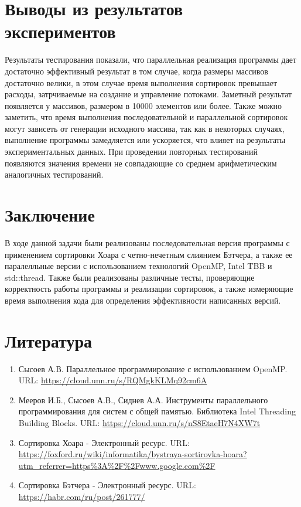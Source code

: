 \documentclass{report}
\begin{document}
\section*{Выводы из результатов экспериментов}
\par Результаты тестирования показали, что параллельная реализация программы дает достаточно эффективный результат в том случае, когда размеры массивов достаточно велики, в этом случае время выполнения сортировок превышает расходы, затрчиваемые на создание и управление потоками. Заметный результат появляется у массивов, размером в 10000 элементов или более. Также можно заметить, что время выполнения последовательной и параллельной сортировок могут зависеть от генерации исходного массива, так как в некоторых случаях, выполнение программы замедляется или ускоряется, что влияет на результаты экспериментальных данных. При проведении повторных тестирований появляются значения времени не совпадающие со среднем арифметическим аналогичных тестирований.
\newpage

\section*{Заключение}
\par В ходе данной задачи были реализованы последовательная версия программы с применением сортировки Хоара с четно-нечетным слиянием Бэтчера, а также ее паралелльные версии с использованием технологий OpenMP, Intel TBB и std::thread.
Также были реализованы различные тесты, проверяющие корректность работы программы и реализации сортировок, а также измеряющие время выполнения кода для определения эффективности написанных версий.
\newpage

\section*{Литература}
\begin{enumerate}
\item Сысоев А.В. Параллельное программирование с использованием OpenMP. URL: \newline
\url{https://cloud.unn.ru/s/RQMgkKLMq92cm6A}
\item Мееров И.Б., Сысоев А.В., Сиднев А.А. Инструменты параллельного программирования для систем с общей памятью. Библиотека Intel Threading Building Blocks. URL: \newline
\url{https://cloud.unn.ru/s/nS8EtaeH7N4XW7t}
\item Сортировка Хоара - Электронный ресурс. URL: \newline
\url{https://foxford.ru/wiki/informatika/bystraya-sortirovka-hoara?utm_referrer=https%3A%2F%2Fwww.google.com%2F}
\item Сортировка Бэтчера - Электронный ресурс. URL: \newline
\url{https://habr.com/ru/post/261777/}
\end{enumerate}
\newpage
\end{document}
